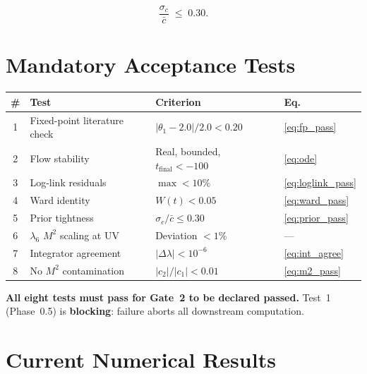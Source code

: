 \documentclass[11pt,a4paper]{article}
\theoremstyle{definition}
\theoremstyle{plain}
\theoremstyle{remark}
\begin{document}
\begin{passcriterion}[title=Prior Tightness]
\begin{equation}
  \frac{\sigma_c}{\bar{c}} \;\leq\; 0.30.
  \label{eq:prior_pass}
\end{equation}
\end{passcriterion}


\section{Mandatory Acceptance Tests}
\label{sec:tests}

\begin{center}
\renewcommand{\arraystretch}{1.3}
\begin{tabular}{clll}
  \toprule
  \textbf{\#} & \textbf{Test} & \textbf{Criterion} & \textbf{Eq.} \\
  \midrule
  1 & Fixed-point literature check &
      $|\theta_1-2.0|/2.0<0.20$ & \eqref{eq:fp_pass} \\
  2 & Flow stability &
      Real, bounded, $t_{\text{final}}<-100$ & \eqref{eq:ode} \\
  3 & Log-link residuals &
      $\max<10\%$ & \eqref{eq:loglink_pass} \\
  4 & Ward identity &
      $W(t)<0.05$ & \eqref{eq:ward_pass} \\
  5 & Prior tightness &
      $\sigma_c/\bar{c}\leq0.30$ & \eqref{eq:prior_pass} \\
  6 & $\lambda_6$ $M^2$ scaling at UV &
      Deviation $<1\%$ & --- \\
  7 & Integrator agreement &
      $|\Delta\lambda|<10^{-6}$ & \eqref{eq:int_agree} \\
  8 & No $M^2$ contamination &
      $|c_2|/|c_1|<0.01$ & \eqref{eq:m2_pass} \\
  \bottomrule
\end{tabular}
\end{center}

\medskip
\noindent
\textbf{All eight tests must pass for Gate~2 to be declared passed.}
Test~1 (Phase~0.5) is \textbf{blocking}: failure aborts all downstream
computation.


\section{Current Numerical Results}
\label{sec:results}
\end{document}
